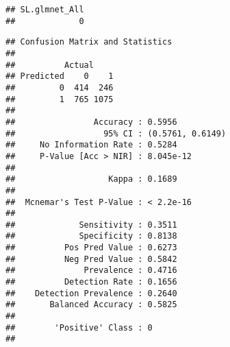 \documentclass[
]{article}
\newenvironment{Shaded}{\begin{snugshade}}{\end{snugshade}}
\newcommand{\AttributeTok}[1]{\textcolor[rgb]{0.13,0.29,0.53}{#1}}
\newcommand{\CommentTok}[1]{\textcolor[rgb]{0.56,0.35,0.01}{\textit{#1}}}
\newcommand{\DecValTok}[1]{\textcolor[rgb]{0.00,0.00,0.81}{#1}}
\newcommand{\FloatTok}[1]{\textcolor[rgb]{0.00,0.00,0.81}{#1}}
\newcommand{\FunctionTok}[1]{\textcolor[rgb]{0.13,0.29,0.53}{\textbf{#1}}}
\newcommand{\NormalTok}[1]{#1}
\newcommand{\OtherTok}[1]{\textcolor[rgb]{0.56,0.35,0.01}{#1}}
\newcommand{\SpecialCharTok}[1]{\textcolor[rgb]{0.81,0.36,0.00}{\textbf{#1}}}
\newcommand{\StringTok}[1]{\textcolor[rgb]{0.31,0.60,0.02}{#1}}
\begin{document}
\begin{verbatim}
## SL.glmnet_All 
##             0
\end{verbatim}

\begin{Shaded}
\end{Shaded}

\begin{verbatim}
## Confusion Matrix and Statistics
## 
##          Actual
## Predicted    0    1
##         0  414  246
##         1  765 1075
##                                           
##                Accuracy : 0.5956          
##                  95% CI : (0.5761, 0.6149)
##     No Information Rate : 0.5284          
##     P-Value [Acc > NIR] : 8.045e-12       
##                                           
##                   Kappa : 0.1689          
##                                           
##  Mcnemar's Test P-Value : < 2.2e-16       
##                                           
##             Sensitivity : 0.3511          
##             Specificity : 0.8138          
##          Pos Pred Value : 0.6273          
##          Neg Pred Value : 0.5842          
##              Prevalence : 0.4716          
##          Detection Rate : 0.1656          
##    Detection Prevalence : 0.2640          
##       Balanced Accuracy : 0.5825          
##                                           
##        'Positive' Class : 0               
## 
\end{verbatim}
\end{document}
